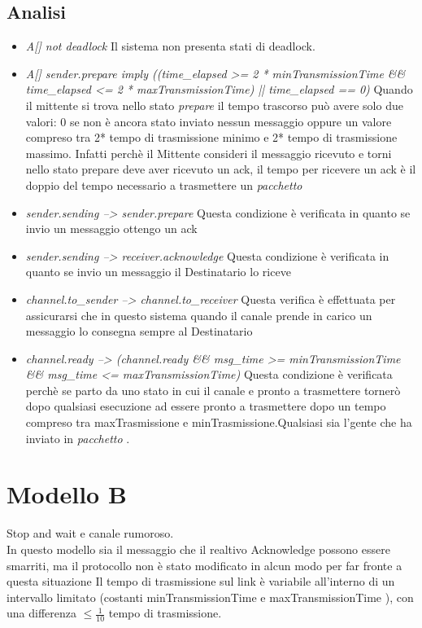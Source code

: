 \documentclass[a4paper]{article}
\newcommand{\pacchetto}{\textit{pacchetto }}
\begin{document}
\subsection{Analisi}
\begin{itemize}
	\item \textit{A[] not deadlock}
		Il sistema non presenta stati di deadlock.
	\item \textit{A[] sender.prepare imply ((time\_elapsed >= 2 * minTransmissionTime \&\& time\_elapsed <= 2 * maxTransmissionTime) || time\_elapsed == 0)}
		Quando il mittente si trova nello stato \textit{prepare} il tempo trascorso può avere solo due valori: 0 se non è ancora stato inviato nessun messaggio oppure un valore compreso tra 2* tempo di trasmissione minimo e 2* tempo di trasmissione massimo. Infatti perchè il Mittente consideri il messaggio ricevuto e torni nello stato prepare deve aver ricevuto un ack, il tempo per ricevere un ack è il doppio del tempo necessario a trasmettere un \pacchetto
	\item \textit{sender.sending --> sender.prepare}
		Questa condizione è verificata in quanto se invio un messaggio ottengo un ack
	\item \textit{sender.sending --> receiver.acknowledge}
		Questa condizione è verificata in quanto se invio un messaggio il Destinatario lo riceve
	\item \textit{channel.to\_sender --> channel.to\_receiver}
		Questa verifica è effettuata per assicurarsi che in questo sistema quando il canale prende in carico un messaggio lo consegna sempre al Destinatario
	\item \textit{channel.ready --> (channel.ready \&\& msg\_time >= minTransmissionTime \&\& msg\_time <= maxTransmissionTime)}
		Questa condizione è verificata perchè se parto da uno stato in cui il canale e pronto a trasmettere tornerò dopo qualsiasi esecuzione ad essere pronto a trasmettere dopo un tempo compreso tra maxTrasmissione e minTrasmissione.Qualsiasi sia l'gente che ha inviato in \pacchetto.
\end{itemize}

\section{Modello B}
Stop and wait e canale rumoroso.\\ 
In questo modello sia il messaggio che il realtivo Acknowledge possono essere smarriti, ma il protocollo non è stato modificato in alcun modo per far fronte a questa situazione
Il tempo di trasmissione sul link è variabile all’interno di un intervallo limitato (costanti minTransmissionTime e maxTransmissionTime ), con una differenza $\leq \frac{1}{10}$ tempo di trasmissione. 
\end{document}
